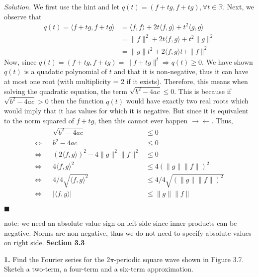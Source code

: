\documentclass{article}
\begin{document}
\vspace{4mm} 
\textit{Solution.} We first use the hint and let \(q(t) = (f + tg, f+tg),  \forall t \in \mathbb{R}\).  Next, we observe that 
\begin{align*}
q(t) = \langle f + tg, f+tg \rangle &= \langle f ,f\rangle + 2t \langle f,g\rangle + t^2 \langle g,g\rangle \\
&= \|f \|^2 +2t\langle f,g\rangle + t^2\|g\|^2\\
&= \|g\| t^2 + 2\langle f,g\rangle t + \|f \|^2
\end{align*}
Now, since \(q(t)= (f + tg, f+tg) = \|f+tg\|^t \Rightarrow q(t) \geq 0\). We have shown \(q(t)\) is a quadatic polynomial of \(t\) and that it is non-negative, thus it can have at most one root (with multiplicity = 2 if it exists). Therefore, this means when solving the quadratic equation, the term \(\sqrt{b^2-4ac} \leq 0 \). This is because if  \( \sqrt{b^2-4ac} >0 \) then the function \(q(t)\) would have exactly two real roots which would imply that it has values for which it is negative. But since it is equivalent to the norm squared of \(f+tg\), then this cannot ever happen \(\rightarrow\!\leftarrow\). Thus, 
\begin{align*}
& & \sqrt{b^2-4ac} &\leq 0 \\
\iff&& b^2-4ac &\leq 0\\ 
\iff && (2\langle f,g\rangle)^2 - 4 \|g\|^2 \|f \|^2  &\leq 0 \\ 
\iff &&   4 \langle f,g\rangle^2  &\leq 4(\|g\| \|f \|)^2  \\
\iff &&   4/4 \sqrt{\langle f,g\rangle^2 }  &\leq 4/4 \sqrt{(\|g\| \|f \|)^2 } \\
\iff && | \langle f,g\rangle | &\leq \|g\| \|f \| 
\end{align*}
\begin{flushright}
 \( \blacksquare \) 
\end{flushright}
note: we need an absolute value sign on left side since inner products can be negative. Norms are non-negative, thus we do not need to specify absolute values on right side. 
\newpage
\textbf{Section 3.3}

\textbf{1.} Find the Fourier series for the \(2\pi\)-periodic square wave shown in Figure 3.7. Sketch a two-term, a four-term and a six-term approximation. 
\end{document}
